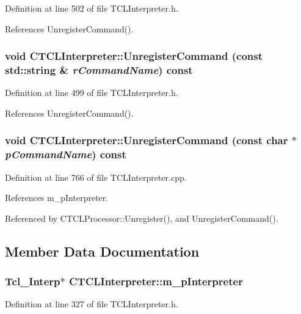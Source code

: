Definition at line 502 of file TCLInterpreter.h.

References Unregister\-Command().
\subsubsection{\setlength{\rightskip}{0pt plus 5cm}void CTCLInterpreter::Unregister\-Command (const std::string \& {\em r\-Command\-Name}) const\hspace{0.3cm}{\tt  [inline]}}\label{classCTCLInterpreter_a40}




Definition at line 499 of file TCLInterpreter.h.

References Unregister\-Command().
\subsubsection{\setlength{\rightskip}{0pt plus 5cm}void CTCLInterpreter::Unregister\-Command (const char $\ast$ {\em p\-Command\-Name}) const}\label{classCTCLInterpreter_a39}




Definition at line 766 of file TCLInterpreter.cpp.

References m\_\-p\-Interpreter.

Referenced by CTCLProcessor::Unregister(), and Unregister\-Command().

\subsection{Member Data Documentation}
\subsubsection{\setlength{\rightskip}{0pt plus 5cm}Tcl\_\-Interp$\ast$ CTCLInterpreter::m\_\-p\-Interpreter\hspace{0.3cm}{\tt  [private]}}\label{classCTCLInterpreter_o0}




Definition at line 327 of file TCLInterpreter.h.

